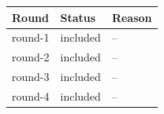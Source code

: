 \begin{tabular}{lll}
\toprule
Round & Status & Reason \\
\midrule
round-1 & included & -- \\
round-2 & included & -- \\
round-3 & included & -- \\
round-4 & included & -- \\
\bottomrule
\end{tabular}
